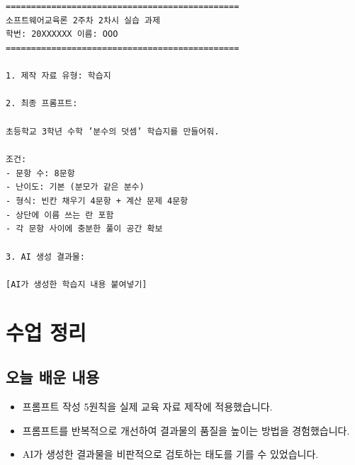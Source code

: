 \documentclass[11pt,a4paper]{article}
\begin{document}
\begin{codebox}
\texttt{==============================================}\\
\texttt{소프트웨어교육론 2주차 2차시 실습 과제}\\
\texttt{학번: 20XXXXXX  이름: OOO}\\
\texttt{==============================================}\\
\\
\texttt{1. 제작 자료 유형: 학습지}\\
\\
\texttt{2. 최종 프롬프트:}\\
\\
\texttt{초등학교 3학년 수학 '분수의 덧셈' 학습지를 만들어줘.}\\
\\
\texttt{조건:}\\
\texttt{- 문항 수: 8문항}\\
\texttt{- 난이도: 기본 (분모가 같은 분수)}\\
\texttt{- 형식: 빈칸 채우기 4문항 + 계산 문제 4문항}\\
\texttt{- 상단에 이름 쓰는 란 포함}\\
\texttt{- 각 문항 사이에 충분한 풀이 공간 확보}\\
\\
\texttt{3. AI 생성 결과물:}\\
\\
\texttt{[AI가 생성한 학습지 내용 붙여넣기]}
\end{codebox}

\newpage

\section{수업 정리}

\subsection{오늘 배운 내용}

\begin{itemize}
  \item 프롬프트 작성 5원칙을 실제 교육 자료 제작에 적용했습니다.
  \item 프롬프트를 반복적으로 개선하여 결과물의 품질을 높이는 방법을 경험했습니다.
  \item AI가 생성한 결과물을 비판적으로 검토하는 태도를 기를 수 있었습니다.
\end{itemize}
\end{document}
